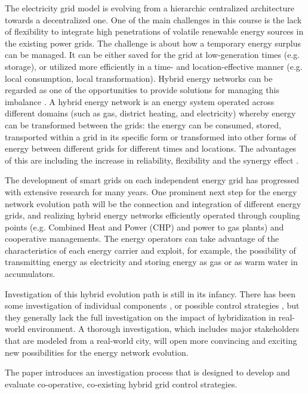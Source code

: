 \documentclass[review]{elsarticle}
\begin{document}
The electricity grid model is evolving from a hierarchic centralized
architecture towards a decentralized one. One of the main challenges 
in this course is the lack of flexibility to integrate high
penetrations of volatile renewable energy sources in the existing
power grids.  
The challenge is about how a temporary energy surplus can be
managed. It can be either saved for the grid at low-generation 
times (e.g. storage), or utilized more efficiently in a time- and
location-effective manner (e.g. local consumption, local
transformation).   
Hybrid energy networks can be regarded as one of the opportunities to  
provide solutions for managing this imbalance \cite{appelrath_2012}.  
A hybrid energy network is an energy system operated across
different domains (such as gas, district heating, and electricity)
whereby energy can be transformed between the grids: the energy can be
consumed, stored, transported within a grid in its specific form or
transformed into other forms of energy between different grids for
different times and locations. 
The advantages of this are including the increase in reliability,
flexibility and the synergy effect \cite{arnold_2011}.

The development of smart grids on each independent energy grid has
progressed with extensive research for many years. One prominent next
step for the energy network evolution path will be the connection and
integration of different energy grids, and realizing hybrid energy
networks efficiently operated through coupling points (e.g. Combined
Heat and Power (CHP) and power to gas plants) and cooperative
managements. 
The energy operators can take advantage of the characteristics of each  
energy carrier and exploit, for example, the possibility of
transmitting energy as electricity and storing energy as gas or as 
warm water in accumulators.  

Investigation of this hybrid evolution path is still in its
infancy. There has been some investigation of individual components
\cite{keirstead_2012}, or possible control strategies
\cite{arnold_2009}, but they generally lack the full investigation on 
the impact of hybridization in real-world environment. A thorough 
investigation, which includes major stakeholders that are modeled
from a real-world city, will open more convincing and exciting new 
possibilities for the energy network evolution. 

The paper introduces an investigation process that is designed    
to develop and evaluate co-operative, co-existing hybrid grid control 
strategies. 
\end{document}
